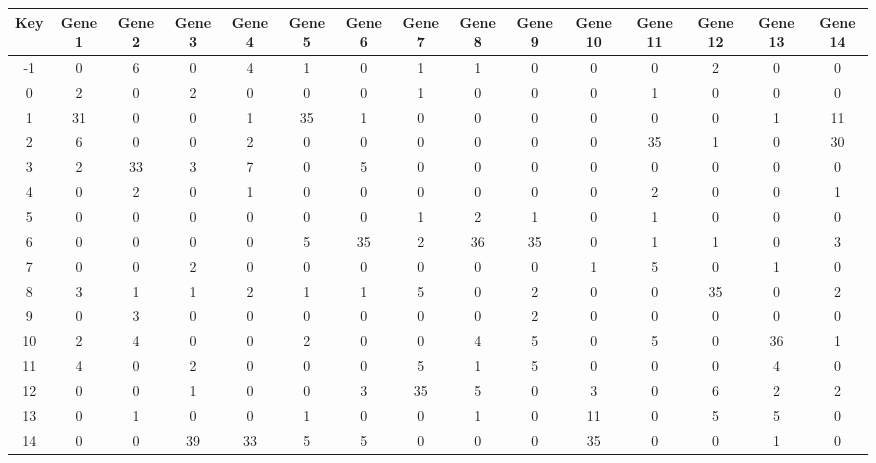 \begin{tabular}{|c|c|c|c|c|c|c|c|c|c|c|c|c|c|c|}
\hline
Key & Gene 1 & Gene 2 & Gene 3 & Gene 4 & Gene 5 & Gene 6 & Gene 7 & Gene 8 & Gene 9 & Gene 10 & Gene 11 & Gene 12 & Gene 13 & Gene 14 \\
\hline
-1 & 0 & 6 & 0 & 4 & 1 & 0 & 1 & 1 & 0 & 0 & 0 & 2 & 0 & 0 \\
0 & 2 & 0 & 2 & 0 & 0 & 0 & 1 & 0 & 0 & 0 & 1 & 0 & 0 & 0 \\
1 & 31 & 0 & 0 & 1 & 35 & 1 & 0 & 0 & 0 & 0 & 0 & 0 & 1 & 11 \\
2 & 6 & 0 & 0 & 2 & 0 & 0 & 0 & 0 & 0 & 0 & 35 & 1 & 0 & 30 \\
3 & 2 & 33 & 3 & 7 & 0 & 5 & 0 & 0 & 0 & 0 & 0 & 0 & 0 & 0 \\
4 & 0 & 2 & 0 & 1 & 0 & 0 & 0 & 0 & 0 & 0 & 2 & 0 & 0 & 1 \\
5 & 0 & 0 & 0 & 0 & 0 & 0 & 1 & 2 & 1 & 0 & 1 & 0 & 0 & 0 \\
6 & 0 & 0 & 0 & 0 & 5 & 35 & 2 & 36 & 35 & 0 & 1 & 1 & 0 & 3 \\
7 & 0 & 0 & 2 & 0 & 0 & 0 & 0 & 0 & 0 & 1 & 5 & 0 & 1 & 0 \\
8 & 3 & 1 & 1 & 2 & 1 & 1 & 5 & 0 & 2 & 0 & 0 & 35 & 0 & 2 \\
9 & 0 & 3 & 0 & 0 & 0 & 0 & 0 & 0 & 2 & 0 & 0 & 0 & 0 & 0 \\
10 & 2 & 4 & 0 & 0 & 2 & 0 & 0 & 4 & 5 & 0 & 5 & 0 & 36 & 1 \\
11 & 4 & 0 & 2 & 0 & 0 & 0 & 5 & 1 & 5 & 0 & 0 & 0 & 4 & 0 \\
12 & 0 & 0 & 1 & 0 & 0 & 3 & 35 & 5 & 0 & 3 & 0 & 6 & 2 & 2 \\
13 & 0 & 1 & 0 & 0 & 1 & 0 & 0 & 1 & 0 & 11 & 0 & 5 & 5 & 0 \\
14 & 0 & 0 & 39 & 33 & 5 & 5 & 0 & 0 & 0 & 35 & 0 & 0 & 1 & 0 \\
\hline
\end{tabular}
